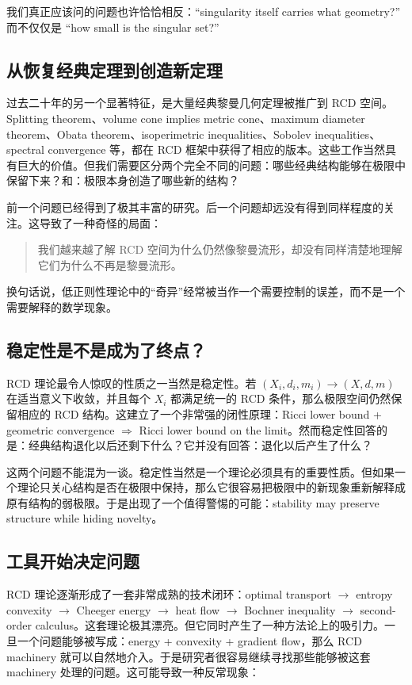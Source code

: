 \documentclass[lualatex]{article}
\begin{document}
我们真正应该问的问题也许恰恰相反：“singularity itself carries what geometry?” 而不仅仅是 “how small is the singular set?”

\subsection{从恢复经典定理到创造新定理}

过去二十年的另一个显著特征，是大量经典黎曼几何定理被推广到 RCD 空间。Splitting theorem、volume cone implies metric cone、maximum diameter theorem、Obata theorem、isoperimetric inequalities、Sobolev inequalities、spectral convergence 等，都在 RCD 框架中获得了相应的版本。这些工作当然具有巨大的价值。但我们需要区分两个完全不同的问题：哪些经典结构能够在极限中保留下来？和：极限本身创造了哪些新的结构？

前一个问题已经得到了极其丰富的研究。后一个问题却远没有得到同样程度的关注。这导致了一种奇怪的局面：

\begin{quote}
我们越来越了解 RCD 空间为什么仍然像黎曼流形，却没有同样清楚地理解它们为什么不再是黎曼流形。
\end{quote}

换句话说，低正则性理论中的“奇异”经常被当作一个需要控制的误差，而不是一个需要解释的数学现象。

\subsection{稳定性是不是成为了终点？}

RCD 理论最令人惊叹的性质之一当然是稳定性。若 $(X_i,d_i,m_i) \longrightarrow (X,d,m)$ 在适当意义下收敛，并且每个 $X_i$ 都满足统一的 RCD 条件，那么极限空间仍然保留相应的 RCD 结构。这建立了一个非常强的闭性原理：Ricci lower bound + geometric convergence $\Longrightarrow$ Ricci lower bound on the limit。然而稳定性回答的是：经典结构退化以后还剩下什么？它并没有回答：退化以后产生了什么？

这两个问题不能混为一谈。稳定性当然是一个理论必须具有的重要性质。但如果一个理论只关心结构是否在极限中保持，那么它很容易把极限中的新现象重新解释成原有结构的弱极限。于是出现了一个值得警惕的可能：stability may preserve structure while hiding novelty。

\subsection{工具开始决定问题}

RCD 理论逐渐形成了一套非常成熟的技术闭环：optimal transport $\longrightarrow$ entropy convexity $\longrightarrow$ Cheeger energy $\longrightarrow$ heat flow $\longrightarrow$ Bochner inequality $\longrightarrow$ second-order calculus。这套理论极其漂亮。但它同时产生了一种方法论上的吸引力。一旦一个问题能够被写成：energy + convexity + gradient flow，那么 RCD machinery 就可以自然地介入。于是研究者很容易继续寻找那些能够被这套 machinery 处理的问题。这可能导致一种反常现象：
\end{document}

